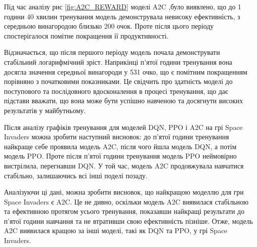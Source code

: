 Під час аналізу рис \ref{fig:A2C_REWARD} моделі A2C ,було виявлено, що до 1 години 40 хвилин
 тренування модель демонструвала невисоку
  ефективність, з середньою винагородою близько 200 очок. Проте після цього періоду 
  спостерігалося помітне покращення її продуктивності.

Відзначається, що після першого періоду модель почала демонструвати стабільний логарифмічний зріст.
 Наприкінці п'ятої години тренування вона досягла значення 
 середньої винагороди у 531 очко, що є помітним покращенням порівняно з початковими 
 показниками. Це свідчить про здатність моделі до поступового та послідовного в\-дос\-коналення в 
процесі тренування, що дає підстави вважати, що вона може бути успішно навченою та
 досягнути високих результатів у майбутньому.\\
 \par Після аналізу графіків тренування для моделей DQN, PPO і A2C на грі Space Invaders можна 
 зробити наступний висновок: до п'ятої години тренування найкраще себе проявила модель A2C, після чого йшла модель DQN,
  а потім модель PPO. Проте після п'ятої години тренування модель PPO ней\-мовірно вистрілила,
 перегнавши DQN. У той час, модель A2C продовжувала 
 навчатися стабільно, залишаючись всі інші поделі позаду.

Аналізуючи ці дані, можна зробити висновок, що найкращою моделлю для гри Space Invaders є
 A2C. Це не дивно, оскільки модель A2C виявилася стабільною та ефективною протягом усього
  тренування, показавши найкращі результати до п'ятої години навчання та не втративши свою
   ефективність пізніше.
Отже, модель A2C виявилася кращою за інші моделі, такі як DQN та PPO, у грі Space Invaders.



